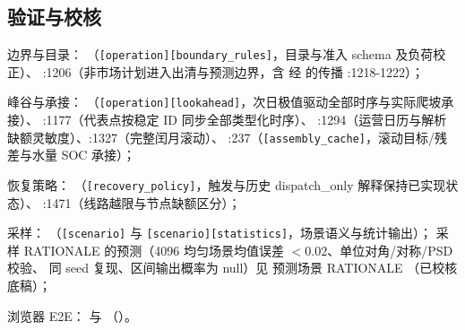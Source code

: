 \subsection{验证与校核}
\begin{itemize}
  \item 边界与目录：
        （\texttt{[operation][boundary\_rules]}，目录与准入 schema 及负荷校正）、
        :1206（非市场计划进入出清与预测边界，含  经
         的传播 :1218-1222）；
  \item 峰谷与承接：
        （\texttt{[operation][lookahead]}，次日极值驱动全部时序与实际爬坡承接）、
        :1177（代表点按稳定 ID 同步全部类型化时序）、
        :1294（运营日历与解析缺额灵敏度）、:1327（完整闰月滚动）、
        :237（\texttt{[assembly\_cache]}，滚动目标/残差与水量 SOC 承接）；
  \item 恢复策略：
        （\texttt{[recovery\_policy]}，触发与历史 dispatch\_only 解释保持已实现状态）、
        :1471（线路越限与节点缺额区分）；
\begin{sloppypar}
  \item 采样：
        （\texttt{[scenario]} 与 \texttt{[scenario][statistics]}，场景语义与统计输出）；
        采样 RATIONALE 的预测（4096 均匀场景均值误差 $<0.02$、单位对角/对称/PSD 校验、
        同 seed 复现、区间输出概率为 null）见
         预测场景 RATIONALE
        （已校核底稿）；
\end{sloppypar}
  \item 浏览器 E2E： 与 
        （）。
\end{itemize}

